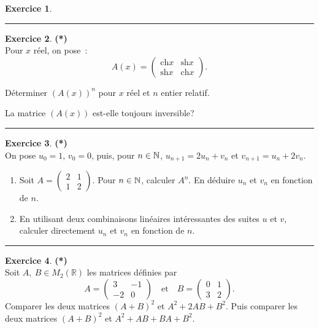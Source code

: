 \documentclass[a4paper,11pt]{article}
\theoremstyle{definition}
\newtheorem{exo}{Exercice} %
\begin{document}
\begin{minipage}{1\linewidth}
\begin{minipage}[t]{0.48\linewidth}
\begin{exo}
	\centering
	\rule{1\linewidth}{0.6pt}
\end{exo}

\begin{exo}\textbf{(*)}\quad\\[0.2cm]
 Pour $x$ réel, on pose~:\hfill\\[-0.5cm]
 
 $$A(x)=
 \left(
 \begin{array}{cc}
 \text{ch} x&\text{sh} x\\
 \text{sh} x&\text{ch} x
 \end{array}
 \right)
 .$$
 
 Déterminer $(A(x))^n$ pour $x$ réel et $n$ entier relatif.
 
 La matrice $(A(x))$ est-elle toujours inversible? 



\centering
\rule{1\linewidth}{0.6pt}
\end{exo}





\end{minipage}	
\hfill\vrule\hfill
\begin{minipage}[t]{0.48\linewidth}
\raggedright

\begin{exo}\textbf{(*)}\quad\\[0.2cm]
	On pose $u_0=1$, $v_0=0$, puis, pour $n\in\mathbb{N}$, $u_{n+1}=2u_n+v_n$ et $v_{n+1}=u_n+2v_n$.
	\begin{enumerate}
		\item  Soit $A=\left(
		\begin{array}{cc}
		2&1\\
		1&2
		\end{array}
		\right)$. Pour $n\in\mathbb{N}$, calculer $A^n$. En déduire $u_n$ et $v_n$ en fonction de $n$.
		\item  En utilisant deux combinaisons linéaires intéressantes des suites $u$ et $v$, calculer directement $u_n$ et $v_n$ en fonction de $n$.
	\end{enumerate}
	\centering
	\rule{1\linewidth}{0.6pt}
\end{exo}


\begin{exo}\textbf{(*)}\quad\\[0.2cm]
Soit $A,\ B\in M_{2}(\mathbb R)$ les matrices définies par
\begin{equation*}
A=\left(\begin{array}{cc} 3 & -1\\-2&0 \end{array} \right)
\quad \textrm{et} \quad B=\left(\begin{array}{cc} 0 & 1\\3&2 \end{array} \right).
\end{equation*}
Comparer les deux matrices $(A+B)^2$ et $A^2+2AB+B^2$. Puis comparer les deux matrices $(A+B)^2$ et $A^2+AB+BA+B^2$.
	


\end{exo}
\end{minipage}
\end{minipage}
\end{document}
